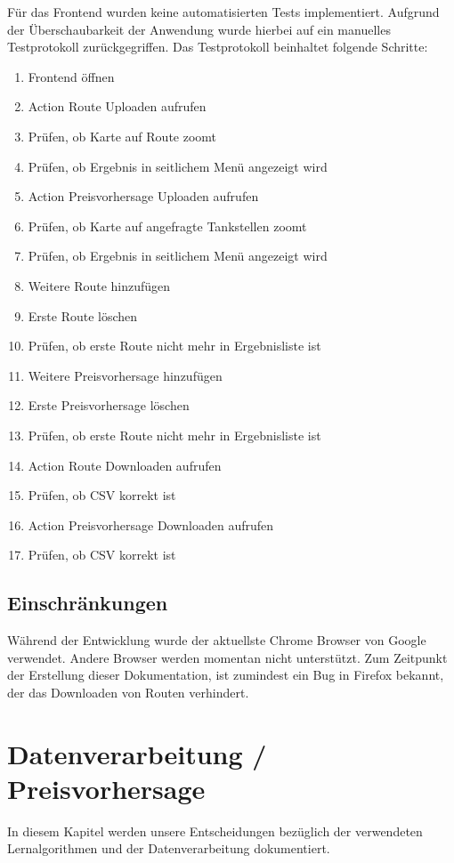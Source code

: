 \documentclass[
ngerman          %
,a4paper          %
,11pt
,pdftex
]{report}
\begin{document}
Für das Frontend wurden keine automatisierten Tests implementiert. Aufgrund der Überschaubarkeit der Anwendung wurde hierbei auf ein manuelles Testprotokoll zurückgegriffen. Das Testprotokoll beinhaltet folgende Schritte:

\begin{enumerate}
\item Frontend öffnen
\item Action Route Uploaden aufrufen
\item Prüfen, ob Karte auf Route zoomt
\item Prüfen, ob Ergebnis in seitlichem Menü angezeigt wird
\item Action Preisvorhersage Uploaden aufrufen
\item Prüfen, ob Karte auf angefragte Tankstellen zoomt
\item Prüfen, ob Ergebnis in seitlichem Menü angezeigt wird
\item Weitere Route hinzufügen
\item Erste Route löschen
\item Prüfen, ob erste Route nicht mehr in Ergebnisliste ist
\item Weitere Preisvorhersage hinzufügen
\item Erste Preisvorhersage löschen
\item Prüfen, ob erste Route nicht mehr in Ergebnisliste ist
\item Action Route Downloaden aufrufen
\item Prüfen, ob CSV korrekt ist
\item Action Preisvorhersage Downloaden aufrufen
\item Prüfen, ob CSV korrekt ist
\end{enumerate}

\subsection{Einschränkungen}

Während der Entwicklung wurde der aktuellste Chrome Browser von Google verwendet. Andere Browser werden momentan nicht unterstützt. Zum Zeitpunkt der Erstellung dieser Dokumentation, ist zumindest ein Bug in Firefox bekannt, der das Downloaden von Routen verhindert.



\section{Datenverarbeitung / Preisvorhersage} \label{feng}
In diesem Kapitel werden unsere Entscheidungen bezüglich der verwendeten Lernalgorithmen und der Datenverarbeitung dokumentiert. 
\end{document}
